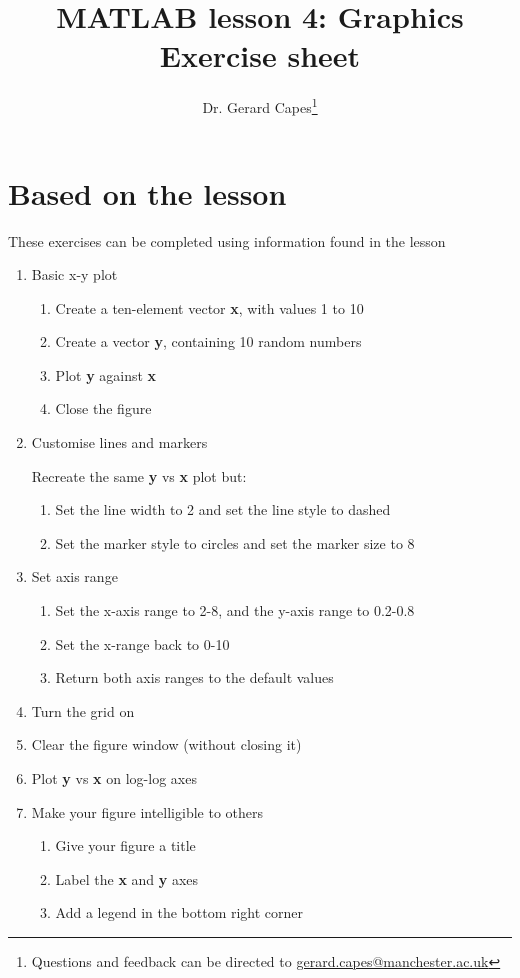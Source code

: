 \documentclass[a4paper]{article}
\title{MATLAB lesson 4: Graphics\\Exercise sheet}
\date{}
\author{Dr. Gerard Capes\thanks{Questions and feedback can be directed to \href{mailto:gerard.capes@manchester.ac.uk?subject=Feedback on MATLAB lesson 4 (plotting) exercise sheet}{gerard.capes@manchester.ac.uk}}}
\begin{document}
\maketitle

\section{Based on the lesson}
{\large These exercises can be completed using information found in the lesson}

\begin{enumerate}
	\item Basic x-y plot
	\begin{enumerate}
		\item Create a ten-element vector \textbf{x}, with values 1 to 10
		\item Create a vector \textbf{y}, containing 10 random numbers
		\item Plot \textbf{y} against \textbf{x}
		\item Close the figure	
	\end{enumerate}
	
	\item Customise lines and markers
	
	Recreate the same \textbf{y} vs \textbf{x} plot but:
	\begin{enumerate}
		
		\item Set the line width to 2 and set the line style to dashed
		\item Set the marker style to circles and set the marker size to 8
	\end{enumerate}

	\item Set axis range
	\begin{enumerate}
	
		\item Set the x-axis range to 2-8, and the y-axis range to 0.2-0.8	
		\item Set the x-range back to 0-10
		\item Return both axis ranges to the default values
	\end{enumerate}
	
	\item Turn the grid on
	\item Clear the figure window (without closing it)
	\item Plot \textbf{y} vs \textbf{x} on log-log axes
	
	\item Make your figure intelligible to others
	\begin{enumerate}
		\item Give your figure a title
		\item Label the \textbf{x} and \textbf{y} axes
		\item Add a legend in the bottom right corner
	\end{enumerate}
	

\end{enumerate}
\end{document}
